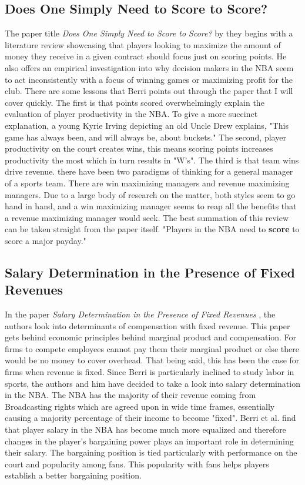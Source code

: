 \documentclass[12pt,english]{article}
\begin{document}
\subsection{Does One Simply Need to Score to Score?}
The paper title \textit{Does One Simply Need to Score to Score?} by \cite{BerriDavid2007DOSN} they begins with a literature review showcasing that players looking to maximize the amount of money they receive in a given contract should focus just on scoring points. He also offers an empirical investigation into why decision makers in the NBA seem to act inconsistently with a focus of winning games or maximizing profit for the club. There are some lessons that Berri points out through the paper that I will cover quickly. The first is that points scored overwhelmingly explain the evaluation of player productivity in the NBA. To give a more succinct explanation, a young Kyrie Irving depicting an old Uncle Drew explains, "This game has always been, and will always be, about buckets." The second, player productivity on the court creates wins, this means scoring points increases productivity the most which in turn results in "W's". The third is that team wins drive revenue. there have been two paradigms of thinking for a general manager of a sports team. There are win maximizing managers and revenue maximizing managers. Due to a large body of research on the matter, both styles seem to go hand in hand, and a win maximizing manager seems to reap all the benefits that a revenue maximizing manager would seek. The best summation of this review can be taken straight from the paper itself. "Players in the NBA need to \textbf{score} to score a major payday."
\subsection{Salary Determination in the Presence of Fixed Revenues}
In the paper \textit{Salary Determination in the Presence of Fixed Revenues} \cite{10095669220150201}, the authors look into determinants of compensation with fixed revenue. This paper gets behind economic principles behind marginal product and compensation. For firms to compete employees cannot pay them their marginal product or else there would be no money to cover overhead. That being said, this has been the case for firms when revenue is fixed. Since Berri is particularly inclined to study labor in sports, the authors and him have decided to take a look into salary determination in the NBA. The NBA has the majority of their revenue coming from Broadcasting rights which are agreed upon in wide time frames, essentially causing a majority percentage of their income to become "fixed". Berri et al. find that player salary in the NBA has become much more equalized and therefore changes in the player's bargaining power plays an important role in determining their salary. The bargaining position is tied particularly with performance on the court and popularity among fans. This popularity with fans helps players establish a better bargaining position. 
\end{document}
